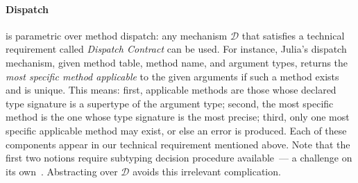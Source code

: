 

\paragraph{Dispatch}\label{sec:disp}

\jules is parametric over method dispatch: any mechanism $\mathcal D$ that
satisfies a technical requirement called \emph{Dispatch Contract} can be used.
For instance, Julia's dispatch mechanism, given method table, method name, and argument types,
returns the \emph{most specific method applicable} to the given arguments
if such a method exists and is unique. This means: first, applicable
methods are those whose declared type signature is a supertype of the argument
type; second, the most specific method is the one whose type signature is the
most precise; third, only one most specific applicable method may exist, or
else an error is produced. Each of these components appear in our technical
requirement mentioned above. Note that the first two notions require subtyping
decision procedure available~--- a challenge on its own~\cite{oopsla18b}. Abstracting over
$\mathcal D$ avoids this irrelevant complication.


